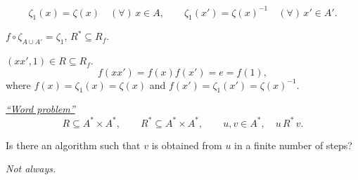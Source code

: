 \noindent
\[
\zeta_1(x)=\zeta(x)\quad(\forall)\,x\in A,
\qquad
\zeta_1(x')=\zeta(x)^{-1}\quad(\forall)\,x'\in A'.
\]

\noindent $f\circ\zeta_{A\cup A'}=\zeta_1$,
\qquad $R^*\subseteq R_f$.

\medskip
\noindent $(xx',1)\in R\subseteq R_f$.
\[
f(xx')=f(x)f(x')=e=f(1),
\]
\noindent where $f(x)=\zeta_1(x)=\zeta(x)$ and
$f(x')=\zeta_1(x')=\zeta(x)^{-1}$.

\bigskip
\noindent\underline{\textit{``Word problem''}}
\[
R\subseteq A^*\times A^*,\qquad
R^*\subseteq A^*\times A^*,\qquad
u,v\in A^*,\quad u\,R^*\,v.
\]

\noindent Is there an algorithm such that $v$ is obtained from $u$
in a finite number of steps?

\medskip
\noindent\textit{Not always.}
